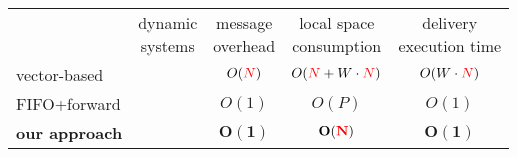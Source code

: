 \small
\begin{tabularx}{0.95\columnwidth}{@{}Xcccc@{}}
  & \makecell{dynamic\\systems} & \makecell{message\\overhead} & \makecell{local space\\consumption} &  \makecell{delivery\\execution time} \\ \cmidrule{2-5}
  vector-based & \YES{\cmark} & $O(\textcolor{red}{N})$ & $O(\textcolor{red}{N}+W\cdot\textcolor{red}{N})$ & $O(W\cdot\textcolor{red}{N})$ \\
  FIFO+forward & \NO{\xmark} & $O(1)$ & $O(P)$ & $O(1)$ \\ \hline\hline
  \textbf{our approach} & \textbf{\YES{\cmark}} & $\mathbf{O(1)}$ & $\mathbf{O(\textcolor{red}{N})}$ & $\mathbf{O(1)}$ \\ 
\end{tabularx}


